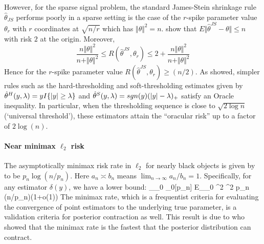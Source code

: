 \documentclass[11pt]{article}
\renewcommand{\E}{\mathbb E}
\numberwithin{equation}{section}
\begin{document}
However, for the sparse signal problem, the standard James-Stein shrinkage rule $ \hat{\theta}_{JS} $ performs poorly in a sparse setting is the case of the $r$-spike parameter value $ \theta_r$ with $r$ coordinates at $ \sqrt{n/r} $ which has $ \Vert \theta \Vert^2 =n $. \citet{johnstone2004needles} show that $ E \Vert \hat{\theta}^{JS} - \theta \Vert \leq n $ with risk $2$ at the origin. Moreover, 
\[
\frac{n \Vert \theta \Vert^2}{ n + \Vert \theta \Vert^2} \leq R \left ( \hat{\theta}^{JS} , \theta_r \right ) \leq
2 + \frac{n \Vert \theta \Vert^2}{ n + \Vert \theta \Vert^2}
\]
Hence for the $r$-spike parameter value $ R \left( \hat{\theta}^{JS} , \theta_r \right) \geq (n/2)$. As \citet{donoho1994ideal} showed, simpler rules such as the hard-thresholding and soft-thresholding estimates given by $\hat{\theta}^{H}(y,\lambda) = y I\{\lvert y\rvert \ge \lambda \}$ and $\hat{\theta}^{S}(y,\lambda) = sgn(y) (\lvert y\rvert - \lambda)_{+}$ satisfy an Oracle inequality. In particular, when the thresholding sequence is close to $\sqrt{2\log n}$ (`universal threshold'), these estimators attain the ``oracular risk'' up to a factor of $2\log(n)$. 

\paragraph{Near minimax $\ell_2$ risk}

The asymptotically minimax risk rate in $\ell_2$ for nearly black objects is given by \citet{donoho1992maximum} to be $p_n \log \left ( n / p_n \right )$. Here $a_n \asymp b_n$ means $\lim_{n\to\infty} a_n/b_n=1$. Specifically, for any estimator $\delta(y)$, we have a lower bound: 
\beq
\sup_{\theta_0 \in \ell_0[p_n]} \E_{\theta_0} ^2  \sigma^2 p_n \log(n/p_n)(1+o(1))
\eeq
The minimax rate, which is a frequentist criteria for evaluating the convergence of point estimators to the underlying true parameter, is a validation criteria for posterior contraction as well. This result is due to \citet{ghosal2000} who showed that the minimax rate is the fastest that the posterior distribution can contract. 
\end{document}
